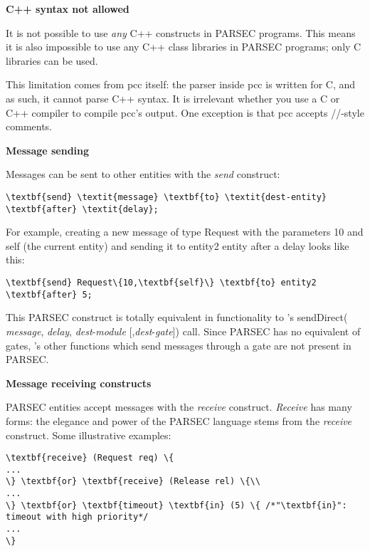 \textbf{C++ syntax not allowed}


It is not possible to use \textit{any} C++ constructs in PARSEC programs. 
This means it is also impossible to use any C++ class libraries 
in PARSEC programs; only C libraries can be used.

This limitation comes from pcc itself: the parser inside pcc 
is written for C, and as such, it cannot parse C++ syntax. It 
is irrelevant whether you use a C or C++ compiler to compile 
pcc's output. One exception is that pcc accepts //-style comments.


\textbf{Message sending}


Messages can be sent to other entities with the \textit{send} construct:

\begin{Verbatim}[commandchars=\\\{\}]
\textbf{send} \textit{message} \textbf{to} \textit{dest-entity} \textbf{after} \textit{delay};
\end{Verbatim}

For example, creating a new message of type Request with the 
parameters 10 and self (the current entity) and sending it to entity2 
entity after a delay looks like this:

\begin{Verbatim}[commandchars=\\\{\}]
\textbf{send} Request\{10,\textbf{self}\} \textbf{to} entity2 \textbf{after} 5;
\end{Verbatim}

This PARSEC construct is totally equivalent in functionality 
to {\opp}'s sendDirect( \textit{message}, \textit{delay}, \textit{dest}-\textit{module} [,\textit{dest}-\textit{gate}]) 
call. Since PARSEC has no equivalent of {\opp} gates, {\opp}'s 
other  functions which send messages through a gate are 
not present in PARSEC.


\textbf{Message receiving constructs }


PARSEC entities accept messages with the \textit{receive} construct. \textit{Receive} 
has many forms: the elegance and power of the PARSEC language 
stems from the \textit{receive} construct. Some illustrative examples:

\begin{Verbatim}[commandchars=\\\{\}]
\textbf{receive} (Request req) \{
...
\} \textbf{or} \textbf{receive} (Release rel) \{\\
...
\} \textbf{or} \textbf{timeout} \textbf{in} (5) \{ /*"\textbf{in}": timeout with high priority*/
...
\}
\end{Verbatim}


